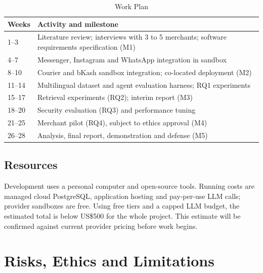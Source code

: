 \documentclass[conference,a4paper]{IEEEtran}
\begin{document}
\begin{table}[!t]
\renewcommand{\arraystretch}{1.2}
\caption{Work Plan}
\label{tab:4}
\centering\footnotesize
\begin{tabular}{|p{}|p{}|}
\hline
\textbf{Weeks} & \textbf{Activity and milestone} \\
\hline
1--3 & Literature review; interviews with 3 to 5 merchants; software requirements specification (M1) \\
\hline
4--7 & Messenger, Instagram and WhatsApp integration in sandbox \\
\hline
8--10 & Courier and bKash sandbox integration; co-located deployment (M2) \\
\hline
11--14 & Multilingual dataset and agent evaluation harness; RQ1 experiments \\
\hline
15--17 & Retrieval experiments (RQ2); interim report (M3) \\
\hline
18--20 & Security evaluation (RQ3) and performance tuning \\
\hline
21--25 & Merchant pilot (RQ4), subject to ethics approval (M4) \\
\hline
26--28 & Analysis, final report, demonstration and defense (M5) \\
\hline
\end{tabular}
\end{table}

\subsection{Resources}
Development uses a personal computer and open-source tools. Running costs are managed cloud PostgreSQL, application hosting and pay-per-use LLM calls; provider sandboxes are free. Using free tiers and a capped LLM budget, the estimated total is below US\$500 for the whole project. This estimate will be confirmed against current provider pricing before work begins.


\section{Risks, Ethics and Limitations}
\end{document}
